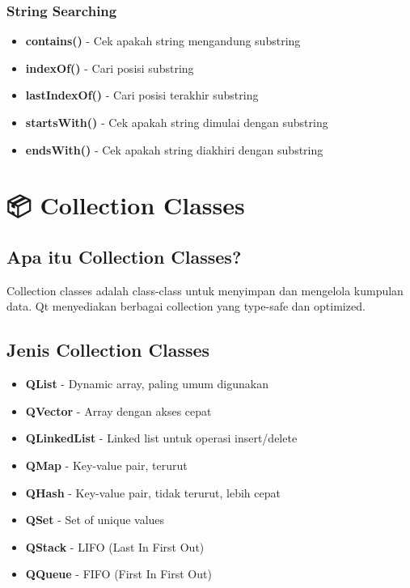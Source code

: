 \subsubsection{String Searching}

\begin{itemize}
\item \textbf{contains()} - Cek apakah string mengandung substring
\item \textbf{indexOf()} - Cari posisi substring
\item \textbf{lastIndexOf()} - Cari posisi terakhir substring
\item \textbf{startsWith()} - Cek apakah string dimulai dengan substring
\item \textbf{endsWith()} - Cek apakah string diakhiri dengan substring
\end{itemize}

\section{📦 Collection Classes}

\subsection{Apa itu Collection Classes?}

Collection classes adalah class-class untuk menyimpan dan mengelola kumpulan data. Qt menyediakan berbagai collection yang type-safe dan optimized.

\subsection{Jenis Collection Classes}

\begin{itemize}
\item \textbf{QList} - Dynamic array, paling umum digunakan
\item \textbf{QVector} - Array dengan akses cepat
\item \textbf{QLinkedList} - Linked list untuk operasi insert/delete
\item \textbf{QMap} - Key-value pair, terurut
\item \textbf{QHash} - Key-value pair, tidak terurut, lebih cepat
\item \textbf{QSet} - Set of unique values
\item \textbf{QStack} - LIFO (Last In First Out)
\item \textbf{QQueue} - FIFO (First In First Out)
\end{itemize}

